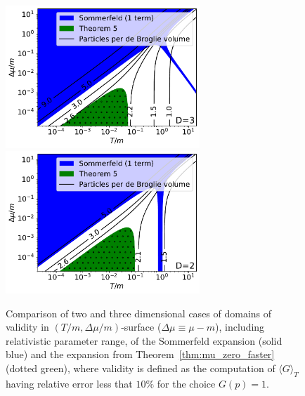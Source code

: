 \documentclass[sn-mathphys,Numbered]{sn-jnl}
\newcommand{\rTh}[1]{Theorem~{\ref{#1}}}
\begin{document}
\begin{figure}  %
\centering
\includegraphics[width=0.65\textwidth]{./plot/Sommerfeld_vs_ours_regions_D3_1_term_deBroglie.pdf}\\
\includegraphics[width=0.65\textwidth]{./plot/Sommerfeld_vs_ours_regions_D2_1_term_deBroglie.pdf}
\caption{Comparison of two and three dimensional cases of domains of validity in $(T/m,\Delta\mu/m)$-surface ($\Delta\mu\equiv\mu-m$), including relativistic parameter range, of the Sommerfeld expansion (solid blue) and the expansion from \rTh{thm:mu_zero_faster} (dotted green), where validity is defined as the computation of $\langle G\rangle_T$ having relative error less that $10\%$ for the choice $G(p)=1$. }\label{fig:Thm3_vs_Sommerfeld_regions_terms_comp_deBroglie}
\end{figure}

\end{document}
